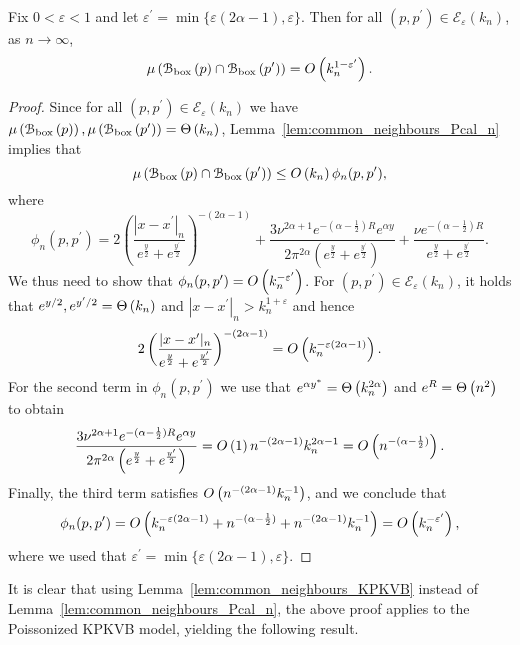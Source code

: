 \begin{lemma}\label{cor:expected_common_neighbours_Ecal_set}
Fix $0 < \varepsilon < 1$ and let $\varepsilon^\prime = \min\{\varepsilon(2\alpha - 1),\varepsilon\}$. Then for all $(p,p^\prime) \in \mathcal{E}_\varepsilon(k_n)$, as $n \to \infty$,
\[
	\mu\left({\mathcal B}_{\text{box}}\left(p\right) \cap {\mathcal B}_{\text{box}}\left(p^\prime\right)\right) = O\left(k_n^{1-\varepsilon^\prime}\right).
\] 
\end{lemma}

\begin{proof}
Since for all $(p,p^\prime) \in \mathcal{E}_\varepsilon(k_n)$ we have $\mu\left({\mathcal B}_{\text{box}}\left(p\right)\right), \mu\left({\mathcal B}_{\text{box}}\left(p^\prime\right)\right) = \Theta\left(k_n\right)$, Lemma~\ref{lem:common_neighbours_Pcal_n} implies that
\[
	\mu\left({\mathcal B}_{\text{box}}\left(p\right) \cap {\mathcal B}_{\text{box}}\left(p^\prime\right)\right) \le O\left(k_n\right) \phi_n(p,p^\prime),
\]
where
\[
	\phi_n(p,p^\prime) = 2\left(\frac{|x - x^\prime|_n}{e^{\frac{y}{2}} + e^{\frac{y^\prime}{2}}}\right)^{-(2\alpha - 1)} 
		+ \frac{3 \nu^{2\alpha + 1}e^{-(\alpha - \frac{1}{2})R} e^{\alpha y}}{2 \pi^{2\alpha}\left(
		e^{\frac{y}{2}} + e^{\frac{y^\prime}{2}}\right)}
		+ \frac{\nu e^{-(\alpha - \frac{1}{2})R}}{e^{\frac{y}{2}} + e^{\frac{y^\prime}{2}}}. 
\]
We thus need to show that $\phi_n(p,p^\prime) = O\left(k_n^{-\varepsilon^\prime}\right)$. For $(p,p^\prime) \in \mathcal{E}_\varepsilon(k_n)$, it holds that $e^{y/2}, e^{y^\prime/2} = \Theta\left(k_n\right)$ and $|x - x^\prime|_n > k_n^{1+\varepsilon}$ and hence
\begin{align*}
	 2\left(\frac{|x - x^\prime|_n}{e^{\frac{y}{2}} + e^{\frac{y^\prime}{2}}}\right)^{-(2\alpha - 1)}
	 =	O\left(k_n^{-\varepsilon(2\alpha - 1)}\right).
\end{align*}
For the second term in $\phi_n(p,p^\prime)$ we use that $e^{\alpha y^\ast} = \Theta\left(k_n^{2\alpha}\right)$ and $e^{R} = \Theta\left(n^2\right)$ to obtain
\[
	\frac{3 \nu^{2\alpha + 1}e^{-(\alpha - \frac{1}{2})R} e^{\alpha y}}{2 \pi^{2\alpha}\left(
			e^{\frac{y}{2}} + e^{\frac{y^\prime}{2}}\right)}
	= O\left(1\right) n^{-(2\alpha - 1)} k_n^{2\alpha - 1} = O\left(n^{-(\alpha - \frac{1}{2})}\right).
\]
Finally, the third term satisfies $O\left(n^{-(2\alpha - 1)}k_n^{-1}\right)$, and we conclude that
\[
	\phi_n(p,p^\prime) = O\left(k_n^{-\varepsilon(2\alpha - 1)} + n^{-(\alpha - \frac{1}{2})}
	+ n^{-(2\alpha - 1)}k_n^{-1}\right) = O\left(k_n^{-\varepsilon^\prime}\right),
\]
where we used that $\varepsilon^\prime = \min\{\varepsilon(2\alpha - 1),\varepsilon\}$. 
\end{proof}

It is clear that using Lemma~\ref{lem:common_neighbours_KPKVB} instead of Lemma~\ref{lem:common_neighbours_Pcal_n}, the above proof applies to the Poissonized KPKVB model, yielding the following result.

